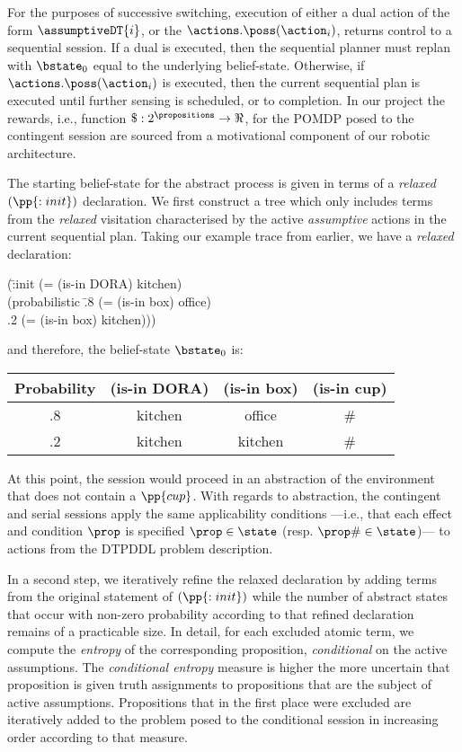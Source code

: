 For the purposes of successive switching, execution of either a dual
action of the form $\assumptiveDT{i}$, or the
$\actions.\poss(\action_i)$, returns control to a sequential
session. If a dual is executed, then the sequential planner must
replan with $\bstate_0$ equal to the underlying
belief-state. Otherwise, if $\actions.\poss(\action_i)$ is executed,
then the current sequential plan is executed until further sensing is
scheduled, or to completion. In our project the rewards, i.e.,
function $\$:2^\propositions\to\Re$, for the POMDP posed to the
contingent session are sourced from a motivational component of our
robotic architecture.

The starting belief-state for the abstract process is given in terms
of a {\em relaxed} $(\pp{:init})$ declaration.  We first construct a
tree which only includes terms from the {\em relaxed} visitation
characterised by the active {\em assumptive} actions in the current
sequential plan. Taking our example trace from earlier, we have a {\em
relaxed} declaration:

\small
\begin{tabtt}
(\=:init (= (is-in DORA) kitchen) \+ \\
       (probabilistic \=.8 (= (is-in box) office)  \\
		      \>.2 (= (is-in box) kitchen))) \\
\end{tabtt}
\normalsize

\noindent and therefore, the belief-state $\bstate_0$ is:

\small
\begin{tabular}{cccc}
\hline
Probability & (is-in DORA)  & (is-in box)  & (is-in cup) \\
\hline
.8 & kitchen & office & \# \\
.2 & kitchen & kitchen & \# \\
\hline
\end{tabular}
\normalsize

\noindent At this point, the session would proceed in an
abstraction of the environment that does not contain a
$\pp{cup}$. With regards to abstraction, the contingent and serial
sessions apply the same applicability conditions ---i.e., that each
effect and condition $\prop$ is specified $\prop\in\state$
(resp. $\prop\#\in\state$)--- to actions from the DTPDDL problem
description.

In a second step, we iteratively refine the relaxed declaration by
adding terms from the original statement of $(\pp{:init})$ while the
number of abstract states that occur with non-zero probability
according to that refined declaration remains of a practicable
size. In detail, for each excluded atomic term, we compute the {\em
entropy} of the corresponding proposition, {\em conditional} on the
active assumptions. The {\em conditional entropy} measure
is higher the more uncertain that proposition is given truth
assignments to propositions that are the subject of active
assumptions. Propositions that in the first place were excluded are
iteratively added to the problem posed to the conditional session in
increasing order according to that measure. 

